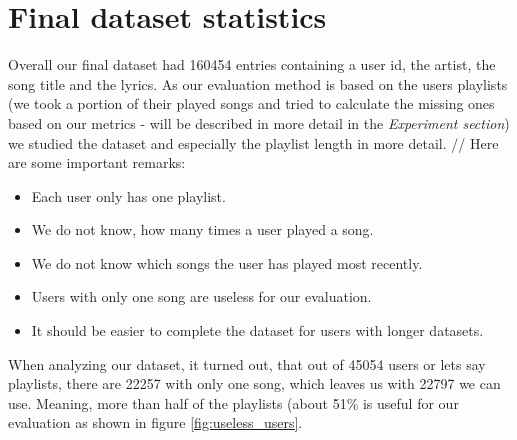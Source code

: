 \section{Final dataset statistics}
Overall our final dataset had 160454 entries containing a user id, the artist, the song title and the lyrics. As our evaluation method is based on the users playlists (we took a portion of their played songs and tried to calculate the missing ones based on our metrics - will be described in more detail in the \textit{Experiment section}) we studied the dataset and especially the playlist length in more detail. //
Here are some important remarks:
\begin{itemize}
    \item Each user only has one playlist.
    \item We do not know, how many times a user played a song.
    \item We do not know which songs the user has played most recently.
    \item Users with only one song are useless for our evaluation.
    \item It should be easier to complete the dataset for users with longer datasets.
\end{itemize} 
When analyzing our dataset, it turned out, that out of 45054 users or lets say playlists, there are 22257 with only one song, which leaves us with 22797 we can use. Meaning, more than half of the playlists (about 51\% is useful for our evaluation as shown in figure \ref{fig:useless_users}.

